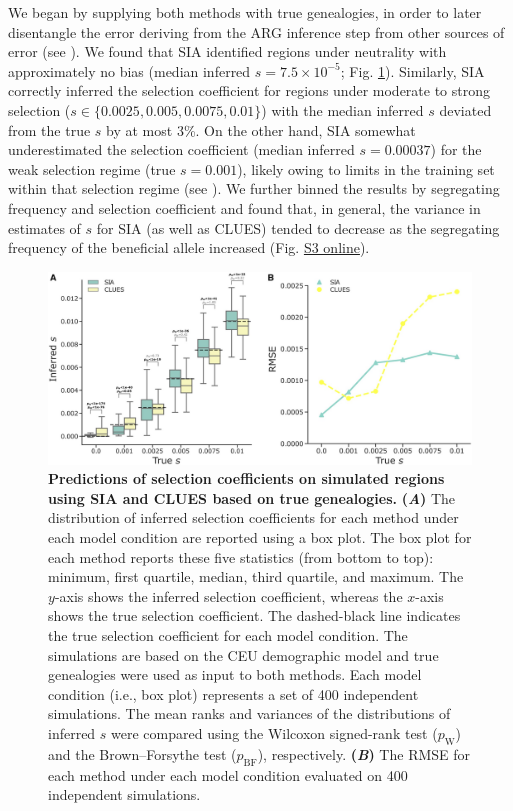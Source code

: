 We began by supplying both methods with true genealogies, in order to later disentangle the error deriving from the \ac{ARG} inference step from other sources of error (see ). We found that \ac{SIA} identified regions under neutrality with approximately no bias (median inferred $s=7.5\times 10^{-5}$; Fig. \ref{fig:SIA-F3}). Similarly, \ac{SIA} correctly inferred the selection coefficient for regions under moderate to strong selection ($s \in \{0.0025, 0.005, 0.0075, 0.01\}$) with the median inferred $s$ deviated from the true $s$ by at most 3\%. On the other hand, \ac{SIA} somewhat underestimated the selection coefficient (median inferred $s = 0.00037$) for the weak selection regime (true $s = 0.001$), likely owing to limits in the training set within that selection regime (see ). We further binned the results by segregating frequency and selection coefficient and found that, in general, the variance in estimates of $s$ for \ac{SIA} (as well as CLUES) tended to decrease as the segregating frequency of the beneficial allele increased (Fig. \href{https://academic.oup.com/mbe/article/39/1/msab332/6433161#supplementary-data}{S3 online}).

\begin{figure}[h]
    \centering
    \includegraphics[width=\textwidth]{SIA_figs/SIA_F3.jpeg}
    \caption[Predictions of selection coefficients on simulated regions using \ac{SIA} and CLUES based on true genealogies.]{\textbf{Predictions of selection coefficients on simulated regions using \ac{SIA} and CLUES based on true genealogies.} \textbf{(\textit{A})} The distribution of inferred selection coefficients for each method under each model condition are reported using a box plot. The box plot for each method reports these five statistics (from bottom to top): minimum, first quartile, median, third quartile, and maximum. The $y$-axis shows the inferred selection coefficient, whereas the $x$-axis shows the true selection coefficient. The dashed-black line indicates the true selection coefficient for each model condition. The simulations are based on the CEU demographic model and true genealogies were used as input to both methods. Each model condition (i.e., box plot) represents a set of 400 independent simulations. The mean ranks and variances of the distributions of inferred $s$ were compared using the Wilcoxon signed-rank test ($p_\mathrm{W}$) and the Brown–Forsythe test ($p_{\mathrm{BF}}$), respectively. \textbf{(\textit{B})} The \acf{RMSE} for each method under each model condition evaluated on 400 independent simulations.}
    \label{fig:SIA-F3}
\end{figure}

